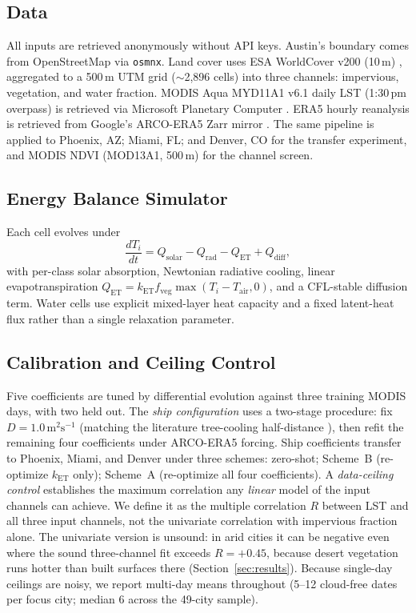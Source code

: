 \documentclass[conference]{IEEEtran}
\begin{document}
\subsection{Data}
All inputs are retrieved anonymously without API keys. Austin's boundary
comes from OpenStreetMap via \texttt{osmnx}. Land cover uses ESA
WorldCover v200 (10\,m) \cite{zanaga2022esa}, aggregated to a 500\,m UTM
grid ($\sim$2{,}896 cells) into three channels: impervious, vegetation,
and water fraction. MODIS Aqua MYD11A1 v6.1 daily LST (1:30\,pm overpass)
is retrieved via Microsoft Planetary Computer \cite{microsoft_pc}. ERA5
hourly reanalysis is retrieved from Google's ARCO-ERA5 Zarr mirror
\cite{hersbach2020era5}. The same pipeline is applied to Phoenix, AZ;
Miami, FL; and Denver, CO for the transfer experiment, and MODIS NDVI
(MOD13A1, 500\,m) for the channel screen.

\subsection{Energy Balance Simulator}
Each cell evolves under
\begin{equation}
  \frac{dT_i}{dt} = Q_{\mathrm{solar}} - Q_{\mathrm{rad}}
                  - Q_{\mathrm{ET}} + Q_{\mathrm{diff}},
  \label{eq:slab}
\end{equation}
with per-class solar absorption, Newtonian radiative cooling, linear
evapotranspiration $Q_{\mathrm{ET}} = k_{\mathrm{ET}} f_{\mathrm{veg}}
\max(T_i - T_{\mathrm{air}}, 0)$, and a CFL-stable diffusion term. Water
cells use explicit mixed-layer heat capacity and a fixed latent-heat flux
rather than a single relaxation parameter.

\subsection{Calibration and Ceiling Control}
Five coefficients are tuned by differential evolution
\cite{storn1997differential} against three training MODIS days, with two
held out. The \emph{ship configuration} uses a two-stage procedure: fix
$D = 1.0\,\text{m}^2\text{s}^{-1}$ (matching the literature tree-cooling
half-distance \cite{ziter2019scale}), then refit the remaining four
coefficients under ARCO-ERA5 forcing. Ship coefficients transfer to
Phoenix, Miami, and Denver under three schemes: zero-shot; Scheme~B
(re-optimize $k_{\mathrm{ET}}$ only); Scheme~A (re-optimize all four
coefficients). A \emph{data-ceiling control} establishes the maximum
correlation any \emph{linear} model of the input channels can achieve. We
define it as the multiple correlation $R$ between LST and all three input
channels, not the univariate correlation with impervious fraction alone.
The univariate version is unsound: in arid cities it can be negative even
where the sound three-channel fit exceeds $R{=}{+}0.45$, because desert
vegetation runs hotter than built surfaces there
(Section~\ref{sec:results}). Because single-day ceilings are noisy, we
report multi-day means throughout (5--12 cloud-free dates per focus
city; median 6 across the 49-city sample).
\end{document}
